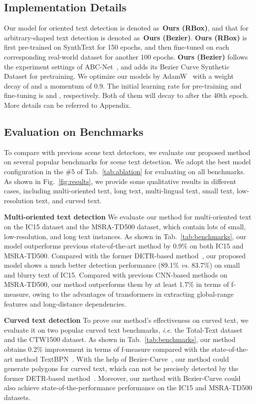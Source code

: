 \documentclass[10pt,twocolumn,letterpaper]{article}
\begin{document}
\subsection{Implementation Details}
Our model for oriented text detection is denoted as~\textbf{Ours (RBox)}, and that for arbitrary-shaped text detection is denoted as~\textbf{Ours (Bezier)}.
\textbf{Ours (RBox)} is first pre-trained on SynthText for 150 epochs, and then fine-tuned on each corresponding real-world dataset for another 100 epochs. 
\textbf{Ours (Bezier)} follows the experiment settings of ABC-Net~\cite{abcnet}, and adds its Bezier Curve Synthetic Dataset for pretraining.
We optimize our models by AdamW~\cite{adamw} with a weight decay of  and a momentum of 0.9.
The initial learning rate for pre-training and fine-tuning is  and , respectively. Both of them will decay to  after the 40th epoch.
More details can be referred to Appendix.


\subsection{Evaluation on Benchmarks}
To compare with previous scene text detectors, we evaluate our proposed method on several popular benchmarks for scene text detection.
We adopt the best model configuration in the \#5 of Tab.~\ref{tab:ablation} for evaluating on all benchmarks.
As shown in Fig.~\ref{fig:results}, we provide some qualitative results in different cases, including multi-oriented text, long text, multi-lingual text, small text, low-resolution text, and curved text.


\noindent \textbf{Multi-oriented text detection}
We evaluate our method for multi-oriented text on the IC15 dataset and the MSRA-TD500 dataset, which contain lots of small, low-resolution, and long text instances.
As shown in Tab.~\ref{tab:benchmarks}, our model outperforms previous state-of-the-art method by 0.9\% on both IC15 and MSRA-TD500.
Compared with the former DETR-based method~\cite{raisi2021transformer}, our proposed model shows a much better detection performance (89.1\% \emph{vs.} 83.7\%) on small and blurry text of IC15.
Compared with previous CNN-based methods on MSRA-TD500, our method outperforms them by at least 1.7\% in terms of f-measure, owing to the advantages of transformers in extracting global-range features and long-distance dependencies.


\noindent \textbf{Curved text detection}
To prove our method's effectiveness on curved text, we evaluate it on two popular curved text benchmarks, \emph{i.e.} the Total-Text dataset and the CTW1500 dataset. 
As shown in Tab.~\ref{tab:benchmarks}, our method obtains 0.2\% improvement in terms of f-measure compared with the state-of-the-art method TextBPN~\cite{TextBPN}.
With the help of Bezier-Curve~\cite{abcnet}, our method could generate polygons for curved text, which can not be precisely detected by the former DETR-based method~\cite{raisi2021transformer}.
Moreover, our method with Bezier-Curve could also achieve state-of-the-performance performance on the IC15 and MSRA-TD500 datasets.
\end{document}
